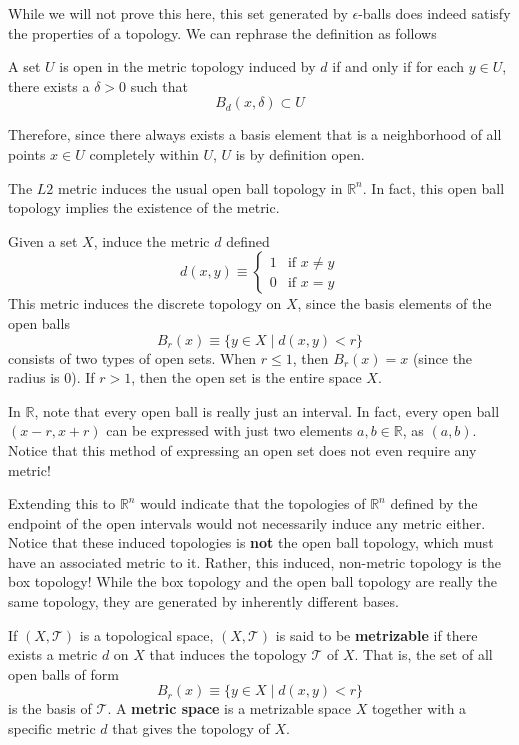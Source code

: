 \documentclass{article}
\begin{document}
  While we will not prove this here, this set generated by $\epsilon$-balls does indeed satisfy the properties of a topology. We can rephrase the definition as follows 

  \begin{definition}
  A set $U$ is open in the metric topology induced by $d$ if and only if for each $y \in U$, there exists a $\delta > 0$ such that 
  \[B_d (x, \delta) \subset U\]
  \end{definition}
  Therefore, since there always exists a basis element that is a neighborhood of all points $x \in U$ completely within $U$, $U$ is by definition open. 

  \begin{example}
  The $L2$ metric induces the usual open ball topology in $\mathbb{R}^n$. In fact, this open ball topology implies the existence of the metric. 
  \end{example}

  \begin{example}
  Given a set $X$, induce the metric $d$ defined
  \[d(x, y) \equiv \begin{cases}
        1 & \text{if } x \neq y \\
        0 & \text{if } x = y
  \end{cases}\]
  This metric induces the discrete topology on $X$, since the basis elements of the open balls
  \[B_r (x) \equiv \{ y \in X \; | \; d(x, y) <r\}\]
  consists of two types of open sets. When $r \leq 1$, then $B_r (x) = x$ (since the radius is $0$). If $r > 1$, then the open set is the entire space $X$. 
  \end{example}

  In $\mathbb{R}$, note that every open ball is really just an interval. In fact, every open ball $(x - r, x + r)$ can be expressed with just two elements $a, b \in \mathbb{R}$, as $(a, b)$. Notice that this method of expressing an open set does not even require any metric! 

  Extending this to $\mathbb{R}^n$ would indicate that the topologies of $\mathbb{R}^n$ defined by the endpoint of the open intervals would not necessarily induce any metric either. Notice that these induced topologies is \textbf{not} the open ball topology, which must have an associated metric to it. Rather, this induced, non-metric topology is the box topology! While the box topology and the open ball topology are really the same topology, they are generated by inherently different bases. 

  \begin{definition}
  If $(X, \mathscr{T})$ is a topological space, $(X, \mathscr{T})$ is said to be \textbf{metrizable} if there exists a metric $d$ on $X$ that induces the topology $\mathscr{T}$ of $X$. That is, the set of all open balls of form
  \[B_r (x) \equiv \{ y \in X \; | \; d(x, y) < r \}\]
  is the basis of $\mathscr{T}$. A \textbf{metric space} is a metrizable space $X$ together with a specific metric $d$ that gives the topology of $X$. 
  \end{definition}
\end{document}
